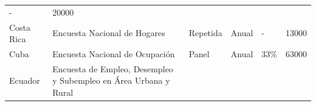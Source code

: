 \documentclass[12pt,spanish,]{book}
\begin{document}
\begin{longtable}[]{@{}llllll@{}}
\begin{minipage}[t]{0.06\columnwidth}
-\strut
\end{minipage} & \begin{minipage}[t]{0.13\columnwidth}\raggedright
20000\strut
\end{minipage}\tabularnewline
\begin{minipage}[t]{0.13\columnwidth}\raggedright
Costa Rica\strut
\end{minipage} & \begin{minipage}[t]{0.38\columnwidth}\raggedright
Encuesta Nacional de Hogares\strut
\end{minipage} & \begin{minipage}[t]{0.06\columnwidth}\raggedright
Repetida\strut
\end{minipage} & \begin{minipage}[t]{0.08\columnwidth}\raggedright
Anual\strut
\end{minipage} & \begin{minipage}[t]{0.06\columnwidth}\raggedright
-\strut
\end{minipage} & \begin{minipage}[t]{0.13\columnwidth}\raggedright
13000\strut
\end{minipage}\tabularnewline
\begin{minipage}[t]{0.13\columnwidth}\raggedright
Cuba\strut
\end{minipage} & \begin{minipage}[t]{0.38\columnwidth}\raggedright
Encuesta Nacional de Ocupación\strut
\end{minipage} & \begin{minipage}[t]{0.06\columnwidth}\raggedright
Panel\strut
\end{minipage} & \begin{minipage}[t]{0.08\columnwidth}\raggedright
Anual\strut
\end{minipage} & \begin{minipage}[t]{0.06\columnwidth}\raggedright
33\%\strut
\end{minipage} & \begin{minipage}[t]{0.13\columnwidth}\raggedright
63000\strut
\end{minipage}\tabularnewline
\begin{minipage}[t]{0.13\columnwidth}\raggedright
Ecuador\strut
\end{minipage} & \begin{minipage}[t]{0.38\columnwidth}\raggedright
Encuesta de Empleo, Desempleo y Subempleo en Área Urbana y Rural\strut
\end{minipage} & \begin{minipage}[t]{0.06\columnwidth}\raggedright

\end{minipage}
\end{longtable}
\end{document}
